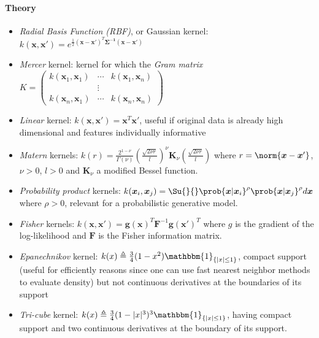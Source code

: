 \paragraph{Theory}
\begin{itemize}
    \item \emph{Radial Basis Function (RBF)}, or Gaussian kernel:  $k(\bm{x}, \bm{x}')
        = e^{\frac{1}{2}(\bm{x} - \bm{x}')^{T}\bm{\Sigma^{-1}}(\bm{x} - \bm{x}')}$
    \item \emph{Mercer} kernel: kernel for which the \emph{Gram matrix} 
        $K=\begin{pmatrix}
            k(\bm{x}_{1}, \bm{x}_{1}) & \cdots & k(\bm{x}_{1}, \bm{x}_{n}) \\
                                      & \vdots &\\
            k(\bm{x}_{n}, \bm{x}_{1}) & \cdots & k(\bm{x}_{n}, \bm{x}_{n}) 
        \end{pmatrix}$ 
    \item \emph{Linear} kernel: $k(\bm{x},\bm{x}') = \bm{x}^{T}\bm{x}'$, useful if 
        original data is already high dimensional and features individually informative
    \item \emph{Matern} kernels: $k(r) = \frac{2^{1-\nu}}{\Gamma(\nu)}\left(\frac{
        \sqrt{2\nu r}}{l}\right)^{\nu}\bm{K}_{\nu}\left(\frac{\sqrt{2\nu r}}{l}\right)$
        where $r=\norm{\bm{x} - \bm{x}'}$, $\nu >0$, $l>0$ and $\bm{K}_{\nu}$ a 
        modified Bessel function. 
    \item \emph{Probability product} kernels: $k(\bm{x}_{i},\bm{x}_{j}) = 
        \Su{}{}\prob{\bm{x}|\bm{x}_{i}}^{\rho}\prob{\bm{x}|\bm{x}_{j}}^{\rho}d\bm{x}$
        where $\rho > 0$, relevant for a probabilistic generative model.
    \item \emph{Fisher} kernels: $k(\bm{x},\bm{x}') = \bm{g}(\bm{x})^{T}\bm{F}^{-1}
        \bm{g}(\bm{x}')^{T}$ where $g$ is the gradient of the log-likelihood and 
        $\bm{F}$ is the Fisher information matrix. 
    \item \emph{Epanechnikov} kernel: $k(x)\triangleq \frac{3}{4}(1-x^{2})\mathbbm{1}_{
        \left\{|x|\leq 1\right\}}$, compact support (useful for efficiently reasons 
        since one can use fast nearest neighbor methods to evaluate density) but not
        continuous derivatives at the boundaries of its support
    \item \emph{Tri-cube} kernel: $k(x)\triangleq \frac{3}{4}(1-|x|^{3})^{3}
        \mathbbm{1}_{\left\{|x|\leq 1\right\}}$, having compact support and two 
        continuous derivatives at the boundary of its support.
\end{itemize}
